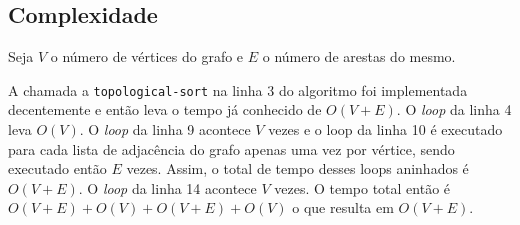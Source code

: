\documentclass[7pt]{article}
\newcommand{\tit}[1]{\textit{#1}}
\newcommand{\ttt}[1]{\texttt{#1}}
\begin{document}
\begin{multicols}{2}
\section{Complexidade}
Seja $V$ o número de vértices do grafo e $E$ o número de arestas do mesmo.

A chamada a \ttt{topological-sort} na linha 3 do algoritmo foi implementada
decentemente e então leva o tempo já conhecido de $O(V + E)$.
O \tit{loop} da linha 4 leva $O(V)$.
O \tit{loop} da linha 9 acontece $V$ vezes e o loop da linha 10 é executado
para cada lista de adjacência do grafo apenas uma vez por vértice, 
sendo executado então $E$ vezes. 
Assim, o total de tempo desses loops aninhados é $O(V + E)$.
O \tit{loop} da linha 14 acontece $V$ vezes.
O tempo total então é $O(V+E) + O(V) + O(V+E) + O(V)$ o que resulta em $O(V+E)$.

\printbibliography

\end{multicols}
\end{document}
